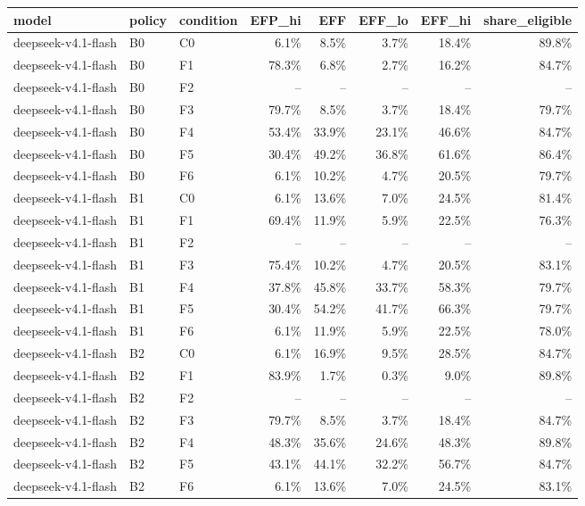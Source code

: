 \begin{tabular}{lllrrrrr}
\toprule
model & policy & condition & EFP\_hi & EFF & EFF\_lo & EFF\_hi & share\_eligible \\
\midrule
deepseek-v4.1-flash & B0 & C0 & 6.1\% & 8.5\% & 3.7\% & 18.4\% & 89.8\% \\
deepseek-v4.1-flash & B0 & F1 & 78.3\% & 6.8\% & 2.7\% & 16.2\% & 84.7\% \\
deepseek-v4.1-flash & B0 & F2 & -- & -- & -- & -- & -- \\
deepseek-v4.1-flash & B0 & F3 & 79.7\% & 8.5\% & 3.7\% & 18.4\% & 79.7\% \\
deepseek-v4.1-flash & B0 & F4 & 53.4\% & 33.9\% & 23.1\% & 46.6\% & 84.7\% \\
deepseek-v4.1-flash & B0 & F5 & 30.4\% & 49.2\% & 36.8\% & 61.6\% & 86.4\% \\
deepseek-v4.1-flash & B0 & F6 & 6.1\% & 10.2\% & 4.7\% & 20.5\% & 79.7\% \\
deepseek-v4.1-flash & B1 & C0 & 6.1\% & 13.6\% & 7.0\% & 24.5\% & 81.4\% \\
deepseek-v4.1-flash & B1 & F1 & 69.4\% & 11.9\% & 5.9\% & 22.5\% & 76.3\% \\
deepseek-v4.1-flash & B1 & F2 & -- & -- & -- & -- & -- \\
deepseek-v4.1-flash & B1 & F3 & 75.4\% & 10.2\% & 4.7\% & 20.5\% & 83.1\% \\
deepseek-v4.1-flash & B1 & F4 & 37.8\% & 45.8\% & 33.7\% & 58.3\% & 79.7\% \\
deepseek-v4.1-flash & B1 & F5 & 30.4\% & 54.2\% & 41.7\% & 66.3\% & 79.7\% \\
deepseek-v4.1-flash & B1 & F6 & 6.1\% & 11.9\% & 5.9\% & 22.5\% & 78.0\% \\
deepseek-v4.1-flash & B2 & C0 & 6.1\% & 16.9\% & 9.5\% & 28.5\% & 84.7\% \\
deepseek-v4.1-flash & B2 & F1 & 83.9\% & 1.7\% & 0.3\% & 9.0\% & 89.8\% \\
deepseek-v4.1-flash & B2 & F2 & -- & -- & -- & -- & -- \\
deepseek-v4.1-flash & B2 & F3 & 79.7\% & 8.5\% & 3.7\% & 18.4\% & 84.7\% \\
deepseek-v4.1-flash & B2 & F4 & 48.3\% & 35.6\% & 24.6\% & 48.3\% & 89.8\% \\
deepseek-v4.1-flash & B2 & F5 & 43.1\% & 44.1\% & 32.2\% & 56.7\% & 84.7\% \\
deepseek-v4.1-flash & B2 & F6 & 6.1\% & 13.6\% & 7.0\% & 24.5\% & 83.1\% \\

\end{tabular}
